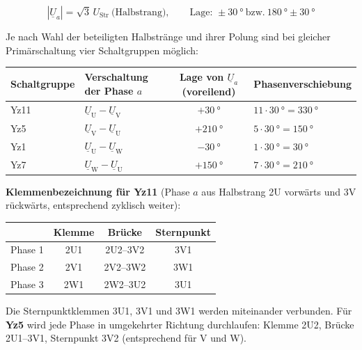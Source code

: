 \documentclass[a4paper,11pt]{scrreprt}
\begin{document}
\begin{center}
\end{center}

\begin{equation*}
  |\underline{U}_a| = \sqrt{3}\,U_\mathrm{Str}\ \text{(Halbstrang)}, \qquad
  \text{Lage: } \pm\SI{30}{\degree}\ \text{bzw.}\ \SI{180}{\degree}\pm\SI{30}{\degree}
\end{equation*}

Je nach Wahl der beteiligten Halbstränge und ihrer Polung sind bei gleicher Primärschaltung vier Schaltgruppen möglich:

\begin{center}
\begin{tabular}{@{}llcl@{}}
\toprule
Schaltgruppe & Verschaltung der Phase $a$ & Lage von $\underline{U}_a$ (voreilend) & Phasenverschiebung\\
\midrule
Yz11 & $\underline{U}_\mathrm{U}-\underline{U}_\mathrm{V}$ & $+\SI{30}{\degree}$  & $11\cdot\SI{30}{\degree}=\SI{330}{\degree}$\\
Yz5  & $\underline{U}_\mathrm{V}-\underline{U}_\mathrm{U}$ & $+\SI{210}{\degree}$ & $5\cdot\SI{30}{\degree}=\SI{150}{\degree}$\\
Yz1  & $\underline{U}_\mathrm{U}-\underline{U}_\mathrm{W}$ & $-\SI{30}{\degree}$  & $1\cdot\SI{30}{\degree}=\SI{30}{\degree}$\\
Yz7  & $\underline{U}_\mathrm{W}-\underline{U}_\mathrm{U}$ & $+\SI{150}{\degree}$ & $7\cdot\SI{30}{\degree}=\SI{210}{\degree}$\\
\bottomrule
\end{tabular}
\end{center}

\textbf{Klemmenbezeichnung für Yz11} (Phase $a$ aus Halbstrang 2U vorwärts und 3V rückwärts, entsprechend zyklisch weiter):
\begin{center}
\small
\begin{tabular}{@{}lccc@{}}
\toprule
 & Klemme & Brücke & Sternpunkt\\
\midrule
Phase 1 & 2U1 & 2U2--3V2 & 3V1\\
Phase 2 & 2V1 & 2V2--3W2 & 3W1\\
Phase 3 & 2W1 & 2W2--3U2 & 3U1\\
\bottomrule
\end{tabular}
\end{center}
Die Sternpunktklemmen 3U1, 3V1 und 3W1 werden miteinander verbunden. Für \textbf{Yz5} wird jede Phase in umgekehrter Richtung durchlaufen: Klemme 2U2, Brücke 2U1--3V1, Sternpunkt 3V2 (entsprechend für V und W).
\end{document}
